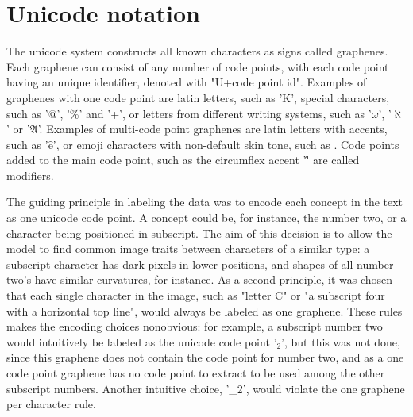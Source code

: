 \documentclass[english,twoside,openright]{HYgraduMLDS}
\begin{document}
\section{Unicode notation}

The unicode system \cite{unicode_homepage} constructs all known characters as signs called graphenes.
Each graphene can consist of any number of code points, with each code point having an unique identifier, denoted with "U+code point id".
Examples of graphenes with one code point are latin letters, such as 'K', special characters, such as '@', '\%' and '+',
or letters from different writing systems, such as '$\omega$', '$\aleph$' or '$\mathfrak{A}$'.
 Examples of multi-code point graphenes 
are latin letters with accents, such as '$\hat{\text{e}}$', or emoji characters with non-default skin tone, such as {}.
Code points added to the main code point, such as the circumflex accent '\^ ' are called modifiers.

The guiding principle in labeling the data was to encode each concept in the text as one unicode code point. A concept could be, for 
instance, the number two, or a character being positioned in subscript. The aim of this decision is to allow the model 
to find common image traits between characters of a similar type: a subscript character has dark pixels in lower positions, and shapes of all 
number two's have similar curvatures, for instance. As a second principle, it was chosen that each single character in the image, such as "letter C" 
or "a subscript four with a horizontal top line", would always be labeled as one graphene. 
These rules makes the encoding choices nonobvious: for example, 
a subscript number two would intuitively be labeled as the unicode code point '$_2$', but this was not done, 
since this graphene does not contain the code point for number two, 
and as a one code point graphene has no code point to extract to be used among the other subscript numbers.
Another intuitive choice, '\_2', would violate the one graphene per character rule.
\end{document}
